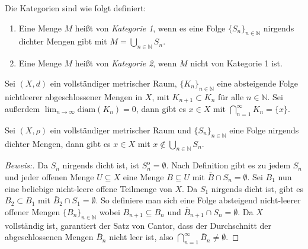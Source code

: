 \begin{rem} Die Kategorien sind wie folgt definiert: 
	\begin{enumerate} 
		\item Eine Menge $M$ heißt von \textit{Kategorie 1}, wenn es eine Folge $\{S_n\}_{n \in \mathbb{N}}$ nirgends dichter Mengen gibt mit $M = \bigcup_{n \in \mathbb{N}} S_n$.
		\item Eine Menge $M$ heißt von \textit{Kategorie 2}, wenn $M$ nicht von Kategorie 1 ist.
	\end{enumerate}
\end{rem}

\begin{theorem} \label{Cantor} 
	Sei $(X, d)$ ein vollständiger metrischer Raum, $\{K_n\}_{n \in \mathbb{N}}$ eine absteigende Folge nichtleerer abgeschlossener Mengen in $X$, mit $K_{n+1} \subset K_n$ für alle $n \in \mathbb{N}$. Sei außerdem $\lim_{n \to \infty} \text{diam}(K_n) = 0$, dann gibt es $x \in X$ mit $\bigcap_{n = 1}^{\infty} K_n = \{x\}$.
\end{theorem}

\begin{theorem} \label{baire_kat}
	Sei $(X, \rho)$ ein vollständiger metrischer Raum und $\{S_n\}_{n \in \mathbb{N}}$ eine Folge nirgends dichter Mengen, dann gibt es $x \in X$ mit $x \notin \bigcup_{n \in \mathbb{N}} S_n$.
	
	\begin{proof}[Beweis:] 
		Da $S_n$ nirgends dicht ist, ist $S_n^{\mathrm{o}} = \emptyset$. Nach Definition gibt es zu jedem $S_n$ und jeder offenen Menge $U \subseteq X$ eine Menge $B \subseteq U$ mit $\bar{B} \cap S_n = \emptyset$. Sei $B_1$ nun eine beliebige nicht-leere offene Teilmenge von $X$. Da $S_1$ nirgends dicht ist, gibt es $B_2 \subset B_1$ mit $\bar{B}_2 \cap S_1 = \emptyset$. So definiere man sich eine Folge absteigend nicht-leerer offener Mengen $\{B_n\}_{n \in \mathbb{N}}$ wobei $B_{n+1} \subseteq B_n$ und $\bar{B}_{n+1} \cap S_n = \emptyset$. Da $X$ vollständig ist, garantiert der Satz von Cantor, dass der Durchschnitt der abgeschlossenen Mengen $\bar{B}_n$ nicht leer ist, also $\bigcap_{n = 1}^{\infty} \bar{B}_n \not= \emptyset$. 
	\end{proof}
\end{theorem}

